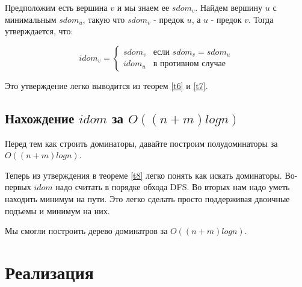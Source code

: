 \documentclass[a4paper, fontsize=12pt]{article}
\begin{document}
\begin{theorem} \label{t8}
Предположим есть вершина $v$ и мы знаем ее $sdom_v$. 
Найдем вершину $u$ с минимальным $sdom_u$, такую что $sdom_v$ - предок $u$, а $u$ - предок $v$. Тогда утверждается, что:

\begin{equation*}
idom_v = 
 \begin{cases}
   sdom_v &\text{если $sdom_v = sdom_u$}\\
   idom_u &\text{в противном случае}
 \end{cases}
\end{equation*}

Это утверждение легко выводится из теорем \ref{t6} и \ref{t7}.

\end{theorem}

\subsection{Нахождение $idom$ за $O((n + m) log n)$}

Перед тем как строить доминаторы, давайте построим полудоминаторы за $O((n + m)logn)$.

Теперь из утверждения в теореме \ref{t8} легко понять как искать доминаторы. Во-первых $idom$ надо считать в порядке обхода DFS. Во вторых нам надо уметь находить минимум на пути. Это легко сделать просто поддерживая двоичные подъемы и минимум на них. 

Мы смогли построить дерево доминатров за $O((n+ m)logn)$.

\newpage

\section{Реализация}



\end{document}
